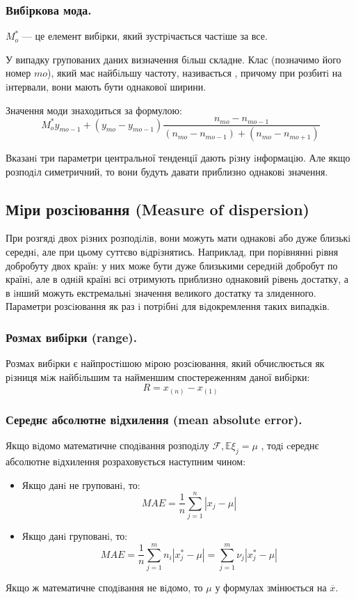 \subsubsection{Вибiркова мода.}
 $M_o^*$ --- це елемент вибiрки, який зустрiчається частiше за все.\par

У випадку групованих даних визначення бiльш складне. Клас (позначимо його номер $mo$), який має найбiльшу частоту, називається , причому при розбитi на iнтервали, вони
мають бути однакової ширини.\par
Значення моди знаходиться за формулою:
$$
M_{o}^* y_{mo-1} + (y_{mo} - y_{mo-1}) \frac{n_{mo} - n_{mo-1}}{(n_{mo} - n_{mo-1}) + (n_{mo} - n_{mo+1})}
$$
\begin{remark}
Вказанi три параметри центральної тенденцiї дають рiзну iнформацiю. Але якщо розподiл
симетричний, то вони будуть давати приблизно однаковi значення.
\end{remark}
\newpage
\subsection{Мiри розсiювання (Measure of dispersion)}
При розгядi двох рiзних розподiлiв, вони можуть мати однаковi або дуже близькi середнi, але
при цьому суттєво вiдрiзнятись. Наприклад, при порiвняннi рiвня добробуту двох країн: у них
може бути дуже близькими середнiй добробут по країнi, але в однiй країнi всi отримують
приблизно однаковий рiвень достатку, а в iнший можуть екстремальнi значення великого
достатку та злиденного. Параметри розсiювання як раз i потрiбнi для вiдокремлення таких
випадкiв.
\subsubsection{Розмах вибiрки (range).}
Розмах вибiрки є найпростiшою мiрою розсiювання, який обчислюється як рiзниця мiж найбiльшим та найменшим спостереженням даної вибiрки:
$$
R = x_{(n)} - x_{(1)}
$$
\subsubsection{Середнє абсолютне вiдхилення (mean absolute error).}
Якщо вiдомо математичне сподiвання розподiлу $\mathcal{F}, \mathbb{E} \xi_j = \mu$ , тодi cереднє абсолютне вiдхилення розраховується наступним чином:

\begin{itemize}
    \item Якщо данi не групованi, то:
    $$
    MAE = \frac{1}{n}  \sum\limits_{j = 1}^{n}{\left| x_j - \mu \right|}
    $$
    \item Якщо данi групованi, то:
    $$
    MAE = \frac{1}{n}  \sum\limits_{j = 1}^{m}{n_i \left| x^*_j - \mu \right|} =  \sum\limits_{j =1 }^{m}{ \nu_j \left| x_j^* - \mu \right|}
    $$
\end{itemize}
Якщо ж математичне сподiвання не вiдомо, то $\mu$ у формулах змінюється на $\overline{x}$.
